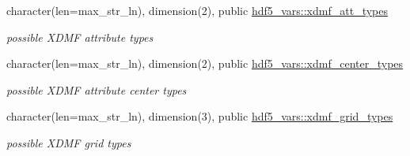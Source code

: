 \begin{DoxyCompactItemize}
character(len=max\+\_\+str\+\_\+ln), dimension(2), public \hyperlink{namespacehdf5__vars_a43c511f4b84cd716387c39c78b2cfe54}{hdf5\+\_\+vars\+::xdmf\+\_\+att\+\_\+types}
\begin{DoxyCompactList}\small\item\em possible X\+D\+MF attribute types \end{DoxyCompactList}\item 
character(len=max\+\_\+str\+\_\+ln), dimension(2), public \hyperlink{namespacehdf5__vars_a7f20d570d2304c8e953646599bf61d73}{hdf5\+\_\+vars\+::xdmf\+\_\+center\+\_\+types}
\begin{DoxyCompactList}\small\item\em possible X\+D\+MF attribute center types \end{DoxyCompactList}\item 
character(len=max\+\_\+str\+\_\+ln), dimension(3), public \hyperlink{namespacehdf5__vars_ab7b59b4afbcaff92aa1c236c23a4bf58}{hdf5\+\_\+vars\+::xdmf\+\_\+grid\+\_\+types}
\begin{DoxyCompactList}\small\item\em possible X\+D\+MF grid types \end{DoxyCompactList}\end{DoxyCompactItemize}
